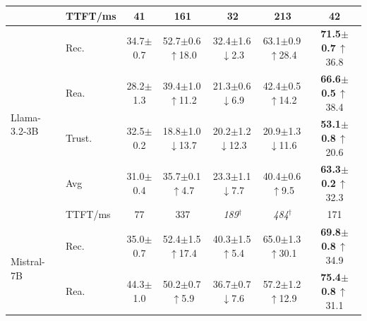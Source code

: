 \begin{table}[t]
\begin{tabular}{@{}ll c c c c | c @{}}
 & TTFT/ms & 41 & 161 & 32 & 213 & 42 \\
\midrule
\multirow{5}{*}{Llama-3.2-3B} & Rec. & 34.7{\scriptsize$\pm$0.7} & 52.7{\scriptsize$\pm$0.6}\,{\tiny\textcolor{green!55!black}{$\uparrow$18.0}} & 32.4{\scriptsize$\pm$1.6}\,{\tiny\textcolor{red!70!black}{$\downarrow$2.3}} & 63.1{\scriptsize$\pm$0.9}\,{\tiny\textcolor{green!55!black}{$\uparrow$28.4}} & \textbf{71.5{\scriptsize$\pm$0.7}}\,{\tiny\textcolor{green!55!black}{$\uparrow$36.8}} \\
 & Rea. & 28.2{\scriptsize$\pm$1.3} & 39.4{\scriptsize$\pm$1.0}\,{\tiny\textcolor{green!55!black}{$\uparrow$11.2}} & 21.3{\scriptsize$\pm$0.6}\,{\tiny\textcolor{red!70!black}{$\downarrow$6.9}} & 42.4{\scriptsize$\pm$0.5}\,{\tiny\textcolor{green!55!black}{$\uparrow$14.2}} & \textbf{66.6{\scriptsize$\pm$0.5}}\,{\tiny\textcolor{green!55!black}{$\uparrow$38.4}} \\
 & Trust. & 32.5{\scriptsize$\pm$0.2} & 18.8{\scriptsize$\pm$1.0}\,{\tiny\textcolor{red!70!black}{$\downarrow$13.7}} & 20.2{\scriptsize$\pm$1.2}\,{\tiny\textcolor{red!70!black}{$\downarrow$12.3}} & 20.9{\scriptsize$\pm$1.3}\,{\tiny\textcolor{red!70!black}{$\downarrow$11.6}} & \textbf{53.1{\scriptsize$\pm$0.8}}\,{\tiny\textcolor{green!55!black}{$\uparrow$20.6}} \\
 & Avg & 31.0{\scriptsize$\pm$0.4} & 35.7{\scriptsize$\pm$0.1}\,{\tiny\textcolor{green!55!black}{$\uparrow$4.7}} & 23.3{\scriptsize$\pm$1.1}\,{\tiny\textcolor{red!70!black}{$\downarrow$7.7}} & 40.4{\scriptsize$\pm$0.6}\,{\tiny\textcolor{green!55!black}{$\uparrow$9.5}} & \textbf{63.3{\scriptsize$\pm$0.2}}\,{\tiny\textcolor{green!55!black}{$\uparrow$32.3}} \\
 & TTFT/ms & 77 & 337 & \textit{189}$^\dagger$ & \textit{484}$^\dagger$ & 171 \\
\midrule
\multirow{5}{*}{Mistral-7B} & Rec. & 35.0{\scriptsize$\pm$0.7} & 52.4{\scriptsize$\pm$1.5}\,{\tiny\textcolor{green!55!black}{$\uparrow$17.4}} & 40.3{\scriptsize$\pm$1.5}\,{\tiny\textcolor{green!55!black}{$\uparrow$5.4}} & 65.0{\scriptsize$\pm$1.3}\,{\tiny\textcolor{green!55!black}{$\uparrow$30.1}} & \textbf{69.8{\scriptsize$\pm$0.8}}\,{\tiny\textcolor{green!55!black}{$\uparrow$34.9}} \\
 & Rea. & 44.3{\scriptsize$\pm$1.0} & 50.2{\scriptsize$\pm$0.7}\,{\tiny\textcolor{green!55!black}{$\uparrow$5.9}} & 36.7{\scriptsize$\pm$0.7}\,{\tiny\textcolor{red!70!black}{$\downarrow$7.6}} & 57.2{\scriptsize$\pm$1.2}\,{\tiny\textcolor{green!55!black}{$\uparrow$12.9}} & \textbf{75.4{\scriptsize$\pm$0.8}}\,{\tiny\textcolor{green!55!black}{$\uparrow$31.1}} \\

\end{tabular}
\end{table}
